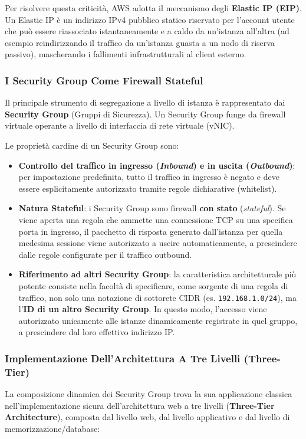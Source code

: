 \documentclass[11pt, a4paper]{article}
\begin{document}
Per risolvere questa criticità, AWS adotta il meccanismo degli \textbf{Elastic IP (EIP)}. Un Elastic IP è un indirizzo IPv4 pubblico statico riservato per l'account utente che può essere riassociato istantaneamente e a caldo da un'istanza all'altra (ad esempio reindirizzando il traffico da un'istanza guasta a un nodo di riserva passivo), mascherando i fallimenti infrastrutturali al client esterno.

\subsubsection{I Security Group Come Firewall Stateful}
Il principale strumento di segregazione a livello di istanza è rappresentato dai \textbf{Security Group} (Gruppi di Sicurezza). Un Security Group funge da firewall virtuale operante a livello di interfaccia di rete virtuale (vNIC).

Le proprietà cardine di un Security Group sono:
\begin{itemize}
    \item \textbf{Controllo del traffico in ingresso (\emph{Inbound}) e in uscita (\emph{Outbound})}: per impostazione predefinita, tutto il traffico in ingresso è negato e deve essere esplicitamente autorizzato tramite regole dichiarative (whitelist).
    \item \textbf{Natura Stateful}: i Security Group sono firewall \textbf{con stato} (\emph{stateful}). Se viene aperta una regola che ammette una connessione TCP su una specifica porta in ingresso, il pacchetto di risposta generato dall'istanza per quella medesima sessione viene autorizzato a uscire automaticamente, a prescindere dalle regole configurate per il traffico outbound.
    \item \textbf{Riferimento ad altri Security Group}: la caratteristica architetturale più potente consiste nella facoltà di specificare, come sorgente di una regola di traffico, non solo una notazione di sottorete CIDR (es. \texttt{192.168.1.0/24}), ma l'\textbf{ID di un altro Security Group}. In questo modo, l'accesso viene autorizzato unicamente alle istanze dinamicamente registrate in quel gruppo, a prescindere dal loro effettivo indirizzo IP.
\end{itemize}

\subsubsection{Implementazione Dell'Architettura A Tre Livelli (Three-Tier)}
La composizione dinamica dei Security Group trova la sua applicazione classica nell'implementazione sicura dell'architettura web a tre livelli (\textbf{Three-Tier Architecture}), composta dal livello web, dal livello applicativo e dal livello di memorizzazione/database:
\end{document}
